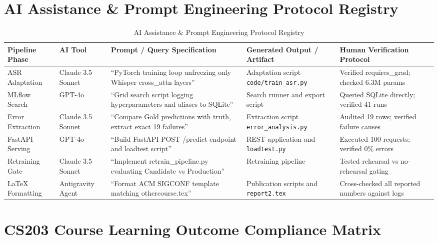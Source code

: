 \documentclass[sigconf,authordraft]{acmart}
\begin{document}
\section{AI Assistance & Prompt Engineering Protocol Registry}
\label{app:ai_registry}

\begin{table}[t]
  \caption{AI Assistance \& Prompt Engineering Protocol Registry}
  \label{tab:ai_registry}
  \centering
  \small
  \begin{tabular}{lllll}
    \toprule
    \textbf{Pipeline Phase} & \textbf{AI Tool} & \textbf{Prompt / Query Specification} & \textbf{Generated Output / Artifact} & \textbf{Human Verification Protocol} \\
    \midrule
    ASR Adaptation & Claude 3.5 Sonnet & ``PyTorch training loop unfreezing only Whisper cross\_attn layers'' & Adaptation script \texttt{code/train\_asr.py} & Verified requires\_grad; checked 6.3M params \\
    MLflow Search & GPT-4o & ``Grid search script logging hyperparameters and aliases to SQLite'' & Search runner and export script & Queried SQLite directly; verified 41 runs \\
    Error Extraction & Claude 3.5 Sonnet & ``Compare Gold predictions with truth, extract exact 19 failures'' & Extraction script \texttt{error\_analysis.py} & Audited 19 rows; verified failure causes \\
    FastAPI Serving & GPT-4o & ``Build FastAPI POST /predict endpoint and loadtest script'' & REST application and \texttt{loadtest.py} & Executed 100 requests; verified 0\% errors \\
    Retraining Gate & Claude 3.5 Sonnet & ``Implement retrain\_pipeline.py evaluating Candidate vs Production'' & Retraining pipeline & Tested rehearsal vs no-rehearsal gating \\
    LaTeX Formatting & Antigravity Agent & ``Format ACM SIGCONF template matching othercourse.tex'' & Publication scripts and \texttt{report2.tex} & Cross-checked all reported numbers against logs \\
    \bottomrule
  \end{tabular}
\end{table}

\section{CS203 Course Learning Outcome Compliance Matrix}
\label{app:course_matrix}
\end{document}
